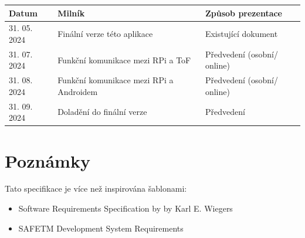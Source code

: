 \documentclass[12pt,a4paper]{article}
\begin{document}
\begin{center}
	\begin{tabular}{|p{2.5cm} | p{8cm} | p{5cm} |} 
		\hline
		\textbf{Datum} & \textbf{Milník} & \textbf{Způsob prezentace} \\ [0.5ex] 
		\hline
		31. 05. 2024 & Finální verze této aplikace & Existující dokument\\  [0.5ex] 
		\hline
		31. 07. 2024 & Funkční komunikace mezi RPi a ToF & Předvedení (osobní/ online) \\ [0.5ex] 
		\hline
		31. 08. 2024 & Funkční komunikace mezi RPi a Androidem & Předvedení (osobní/ online) \\ [0.5ex] 
		\hline
		31. 09. 2024 & Doladění do finální verze & Předvedení \\  [0.5ex] 
		\hline
	\end{tabular}
\end{center}

\section{Poznámky}

Tato specifikace je více než inspirována šablonami:
\begin{itemize}
	\item Software Requirements Specification by by Karl E. Wiegers
	\item SAFETM Development System Requirements
\end{itemize}
\end{document}
